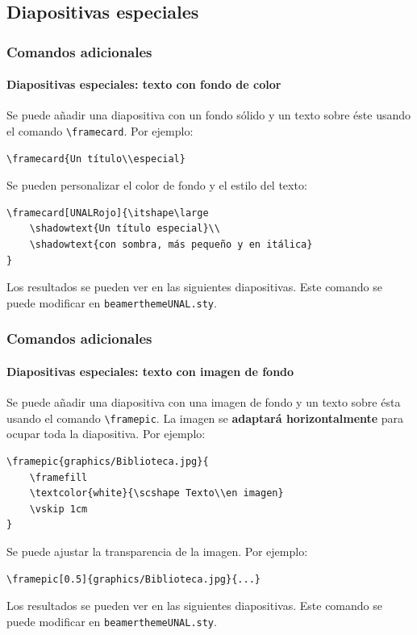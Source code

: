 \documentclass[aspectratio=169,usenames,dvipsnames,spanish]{beamer}
\begin{document}
\subsection{Diapositivas especiales}

\begin{frame}[fragile]
\frametitle{Comandos adicionales}
\framesubtitle{Diapositivas especiales: texto con fondo de color}
 Se puede añadir una diapositiva con un fondo sólido y un texto sobre éste usando el comando \texttt{\textbackslash framecard}. Por ejemplo:
\begin{verbatim}
\framecard{Un título\\especial}
\end{verbatim}

Se pueden personalizar el color de fondo y el estilo del texto:
\begin{verbatim}
\framecard[UNALRojo]{\itshape\large
    \shadowtext{Un título especial}\\
    \shadowtext{con sombra, más pequeño y en itálica}
}
\end{verbatim}

Los resultados se pueden ver en las siguientes diapositivas. Este comando se puede modificar en \texttt{beamerthemeUNAL.sty}.

\end{frame}



\begin{frame}[fragile]
\frametitle{Comandos adicionales}
\framesubtitle{Diapositivas especiales: texto con imagen de fondo}
Se puede añadir una diapositiva con una imagen de fondo y un texto sobre ésta usando el comando \texttt{\textbackslash framepic}. La imagen se \textbf{adaptará horizontalmente} para ocupar toda la diapositiva. Por ejemplo:
\begin{verbatim}
\framepic{graphics/Biblioteca.jpg}{
    \framefill
    \textcolor{white}{\scshape Texto\\en imagen}
    \vskip 1cm
}
\end{verbatim}

Se puede ajustar la transparencia de la imagen. Por ejemplo:
\begin{verbatim}
\framepic[0.5]{graphics/Biblioteca.jpg}{...}
\end{verbatim}

Los resultados se pueden ver en las siguientes diapositivas. Este comando se puede modificar en \texttt{beamerthemeUNAL.sty}.
\end{frame}
\end{document}
